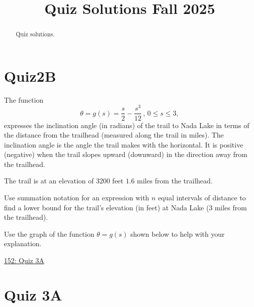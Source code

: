 \documentclass{ximera}
\title{Quiz Solutions Fall 2025}
\begin{document}
\begin{abstract}
Quiz solutions.
\end{abstract}
\maketitle



\section{Quiz2B}
\begin{question} \label{QldfFDLRE}
The function
\[
      \theta = g(s) = \frac{s}{2} - \frac{s^3}{12} \, , \, 0\leq s \leq 3 , 
\]
expresses the inclination angle (in radians) of the trail to Nada Lake in terms of the distance from the trailhead (measured along the trail in miles). The inclination angle is the angle the trail makes with the horizontal. It is positive (negative) when the trail slopes upward (downward) in the direction away from the trailhead.

The trail is at an elevation of $3200$ feet $1.6$ miles from the trailhead.

Use summation notation for an expression with $n$ equal intervals of distance to find a lower bound for the trail's elevation (in feet) at Nada Lake (3 miles from the trailhead).

Use the graph of the function $\theta=g(s)$ shown below to help with your explanation.

\begin{onlineOnly}
    \begin{center}
\end{center}
\end{onlineOnly}

\href{https://www.desmos.com/calculator/nzhemrajow}{152: Quiz 3A}


\end{question}




\section{Quiz 3A}
\end{document}

